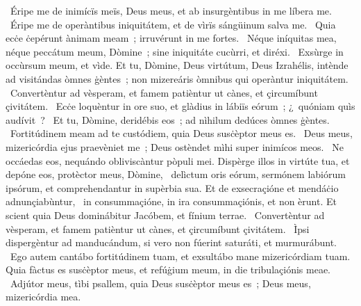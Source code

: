 \psalmChapterWithInscription{}
{ }
{%
~Éripe me de inimícïs meïs, Deus meus, et ab insurgèntibus in me líbera me. 
~Éripe me de operàntibus iniquitátem, et de vìrïs sángüinum salva me. 
~Quia ecċe ċepérunt ànimam meam~; irruvérunt in me fortes. 
~Néque iníquitas mea, néque peccátum meum, Dòmine~; sine iniquitáte cucùrri, et diréxi. 
~Exsùrge in occùrsum meum, et vìde. Et tu, Dòmine, Deus virtútum, Deus Izrahélis, intènde ad visitándas òmnes ġèntes~; non mizereáris òmnibus qui operàntur iniquitátem. 
~Convertèntur ad vèsperam, et famem patièntur ut cànes, et çircumíbunt çivitátem. 
~Ecċe loquèntur in ore suo, et glàdius in lábiïs eórum~; ¿~quóniam quìs audívit~? 
~Et tu, Dòmine, deridébis eos~; ad nìhilum dedúces òmnes ġèntes. 
~Fortitúdinem meam ad te custódiem, quia Deus susċèptor meus es. 
~Deus meus, mizericórdia ejus praevèniet me~; Deus ostèndet mìhi super inimícos meos. 
~Ne occáedas eos, nequándo obliviscàntur pòpuli mei. Dispèrge illos in virtúte tua, et depóne eos, protèctor meus, Dòmine, 
~delìctum oris eórum, sermónem labiórum ipsórum, et comprehendantur in supèrbia sua. Et de exsecraçióne et mendáċio adnunçiabùntur, 
~in consummaçióne, in ira consummaçiónis, et non èrunt. Et scient quia Deus dominábitur Jacóbem, et fínium terrae. 
~Convertèntur ad vèsperam, et famem patièntur ut cànes, et çircumíbunt çivitátem. 
~Ìpsi dispergèntur ad manducándum, si vero non fúerint saturáti, et murmurábunt. 
~Ego autem cantábo fortitúdinem tuam, et exsultábo mane mizericórdiam tuam. Quia fàctus es susċèptor meus, et refúġium meum, in die tribulaçiónis meae. 
~Adjútor meus, tìbi psallem, quia Deus susċèptor meus es~; Deus meus, mizericórdia mea. 
}
